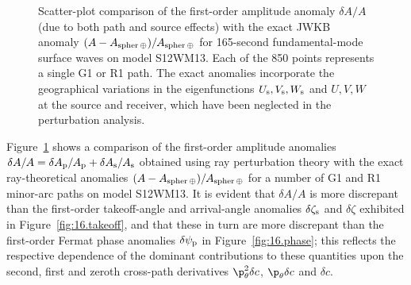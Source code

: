 \addtocounter{figure}{1}
\begin{figure}[!b]
\begin{center}
\end{center}
\caption[amp]{\label{fig:16.amp}
Scatter-plot comparison of the first-order amplitude anomaly
$\delta A/A$ (due to both path and source effects) with the exact
JWKB anomaly $(A-A_{\rm spher\,\oplus})/A_{\rm spher\,\oplus}$ for
165-second fundamental-mode surface waves on model S12WM13.
Each of the 850 points represents a single G1 or R1 path.
The exact anomalies incorporate the geographical variations
in the eigenfunctions $U_{\rm s},V_{\rm s},W_{\rm s}$ and $U,V,W$ 
at the source and receiver, which have been neglected in the
perturbation analysis.}
\end{figure}

Figure~\ref{fig:16.amp} shows a comparison of the first-order
amplitude anomalies $\delta A/A=
\delta A_{\rm p}/A_{\rm p}+\delta A_{\rm s}/A_{\rm s}$
obtained using ray perturbation theory with the exact ray-theoretical
anomalies $(A-A_{\rm spher\,\oplus})/A_{\rm spher\,\oplus}$
for a number of G1 and R1 minor-arc paths on model S12WM13.
It is evident that $\delta A/A$ is more discrepant than the
first-order takeoff-angle and arrival-angle anomalies
$\delta\zeta_{\rm s}$ and $\delta\zeta$
exhibited in Figure~\ref{fig:16.takeoff},
and that these in turn are more discrepant than the
first-order Fermat phase anomalies $\delta\psi_{\rm p}$
in Figure~\ref{fig:16.phase}; this reflects the
respective dependence of the dominant contributions
to these quantities upon the second, first and zeroth
cross-path derivatives $\p_{\theta}^2\delta c$,
$\p_{\theta}\delta c$ and $\delta c$. 

\renewcommand{\thesubsection}{$\!\!\!\raise1.3ex\hbox{$\star$}\!\!$
\arabic{chapter}.\arabic{section}.\arabic{subsection}}
